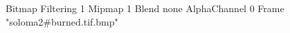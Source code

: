 {Bitmap
	{Filtering 1}
	{Mipmap 1}
	{Blend none}
	{AlphaChannel 0}
	{Frame "soloma2#burned.tif.bmp"}
}
